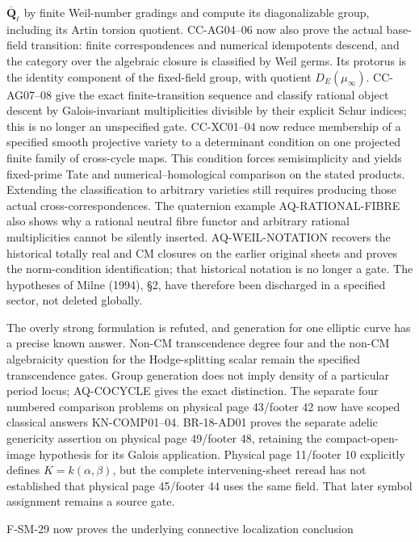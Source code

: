 \documentclass[11pt,a4paper]{article}
\theoremstyle{definition}\newtheorem{definition}[theorem]{Definition}
\theoremstyle{remark}\newtheorem{remark}[theorem]{Remark}
\begin{document}
\begin{description}[style=nextline,leftmargin=0pt,labelwidth=0pt,labelsep=0pt]
$\overline{\mathbf Q}_\ell$ by finite Weil-number gradings and
compute its diagonalizable group, including its Artin torsion quotient. CC-AG04--06 now also prove the
actual base-field transition: finite correspondences and numerical
idempotents descend, and the category over the algebraic closure is
classified by Weil germs. Its protorus is the identity component of
the fixed-field group, with quotient $D_E(\mu_\infty)$.
CC-AG07--08 give the exact finite-transition sequence and classify
rational object descent by Galois-invariant multiplicities divisible
by their explicit Schur indices; this is no longer an unspecified gate.
CC-XC01--04 now reduce membership of a specified smooth projective
variety to a determinant condition on one projected finite family
of cross-cycle maps. This condition forces semisimplicity and yields
fixed-prime Tate and numerical--homological comparison on the stated
products. Extending the classification to arbitrary varieties still
requires producing those actual cross-correspondences. The
quaternion example AQ-RATIONAL-FIBRE also shows why a rational neutral
fibre functor and arbitrary rational multiplicities cannot be silently
inserted. AQ-WEIL-NOTATION recovers the historical totally real and CM
closures on the earlier original sheets and proves the norm-condition
identification; that historical notation is no longer a gate.
The hypotheses of Milne (1994), \S2, have therefore been
discharged in a specified sector, not deleted globally.
\item[Cote 18, scans 11--13 and 59: period density.]
The overly strong formulation is refuted, and generation for one
elliptic curve has a precise known answer. Non-CM transcendence degree
four and the non-CM algebraicity question for the Hodge-splitting
scalar remain the specified transcendence gates. Group generation
does not imply density of a particular period locus; AQ-COCYCLE
gives the exact distinction. The separate four numbered comparison
problems on physical page 43/footer 42 now have scoped classical
answers KN-COMP01--04. BR-18-AD01 proves the separate adelic
genericity assertion on physical page 49/footer 48, retaining the
compact-open-image hypothesis for its Galois application.
Physical page 11/footer 10 explicitly defines $K=k(\alpha,\beta)$,
but the complete intervening-sheet reread has not established that
physical page 45/footer 44 uses the same field. That later symbol
assignment remains a source gate.
\item[Cote 134-8, footers 47--54: abstract scope and ordinary right adjoint.]
F-SM-29 now proves the underlying connective localization conclusion

\end{description}
\end{document}
